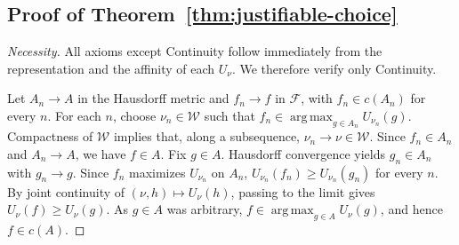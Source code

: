 \documentclass[11pt]{article}
\begin{document}
\subsection{Proof of Theorem~\ref{thm:justifiable-choice}}

\begin{proof}[Necessity]
All axioms except Continuity follow immediately from the representation
and the affinity of each $U_\nu$. We therefore verify only Continuity.

Let $A_n\to A$ in the Hausdorff metric and $f_n\to f$ in
$\mathcal F$, with $f_n\in c(A_n)$ for every $n$. For each $n$,
choose $\nu_n\in\mathcal W$ such that
$f_n\in\operatorname*{arg\,max}_{g\in A_n}U_{\nu_n}(g)$.
Compactness of $\mathcal W$ implies that, along a subsequence,
$\nu_n\to\nu\in\mathcal W$. Since $f_n\in A_n$ and $A_n\to A$,
we have $f\in A$. Fix $g\in A$. Hausdorff convergence yields
$g_n\in A_n$ with $g_n\to g$. Since $f_n$ maximizes $U_{\nu_n}$
on $A_n$, $U_{\nu_n}(f_n)\geq U_{\nu_n}(g_n)$ for every $n$.
By joint continuity of $(\nu,h)\mapsto U_\nu(h)$, passing to the
limit gives $U_\nu(f)\geq U_\nu(g)$. As $g\in A$ was arbitrary,
$f\in\operatorname*{arg\,max}_{g\in A}U_\nu(g)$, and hence
$f\in c(A)$.
\end{proof}
\end{document}
